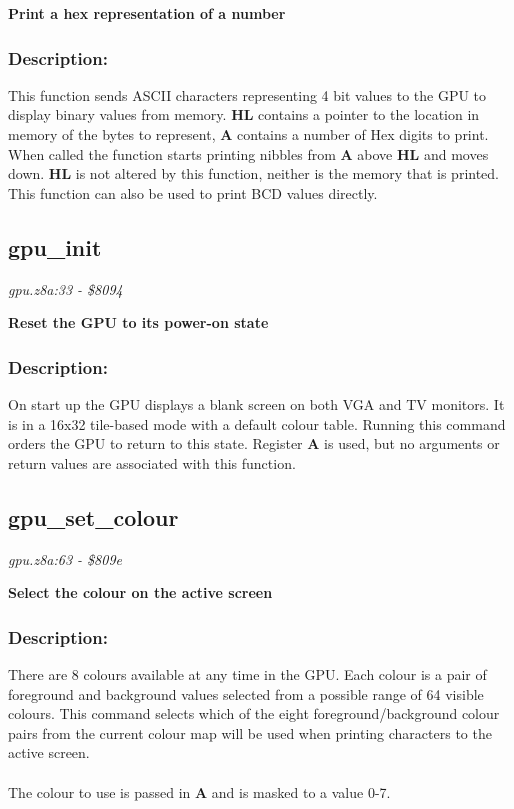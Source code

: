 \noindent
\textbf{Print a hex representation of a number}

\subsubsection{Description:}
 This function sends ASCII characters representing 4 bit values to the GPU to display binary values from memory.  \textbf{HL} contains a pointer to the location in memory of the bytes to represent, \textbf{A} contains a number of Hex digits to print.  When called the function starts printing nibbles from \textbf{A} above \textbf{HL} and moves down.  \textbf{HL} is not altered by this function, neither is the memory that is printed.  This function can also be used to print BCD values directly.

\subsection{gpu\_init}
\textit{gpu.z8a:33 - \$8094}

\noindent
\textbf{Reset the GPU to its power-on state}

\subsubsection{Description:}
 On start up the GPU displays a blank screen on both VGA and TV monitors.  It is in a 16x32 tile-based mode with a default colour table.  Running this command orders the GPU to return to this state.  Register \textbf{A} is used, but no arguments or return values are associated with this function.

\subsection{gpu\_set\_colour}
\textit{gpu.z8a:63 - \$809e}

\noindent
\textbf{Select the colour on the active screen}

\subsubsection{Description:}
 There are 8 colours available at any time in the GPU.  Each colour is a pair of foreground and background values selected from a possible range of 64 visible colours.  This command selects which of the eight foreground/background colour pairs from the current colour map will be used when printing characters to the active screen.\\\\ The colour to use is passed in \textbf{A} and is masked to a value 0-7.

